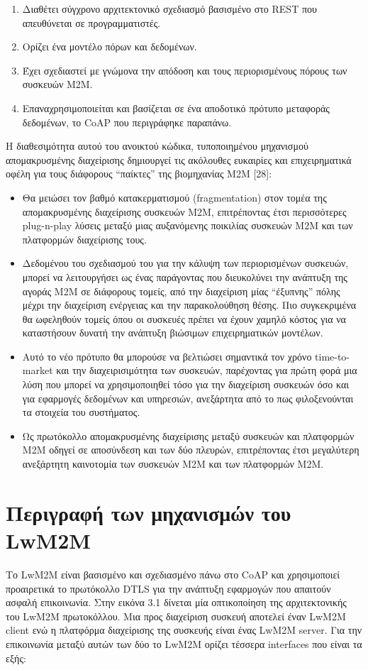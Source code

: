 \begin{enumerate}
	\item{Διαθέτει σύγχρονο αρχιτεκτονικό σχεδιασμό βασι­σμένο στο REST που απευθύνεται σε προγραμματιστές.}
	\item{Ορίζει ένα μοντέλο πόρων και δεδομένων.}
	\item{Έχει σχεδιαστεί με γνώμονα την απόδοση και τους περιορισμένους πόρους των συσκευών Μ2Μ.}
	\item{Επαναχρησιμοποιείται και βασίζεται σε ένα αποδοτικό πρότυπο μεταφοράς δεδομένων, το CoAP που περιγράφηκε παραπάνω.}
\end{enumerate}

Η διαθεσιμότητα αυτού του ανοικτού κώδικα, τυποποιη­μένου μηχανισμού απομακρυσμένης διαχείρισης δημιουργεί τις ακόλουθες ευκαιρίες και επιχειρηματικά οφέλη για τους διάφο­ρους “παίκτες” της βιομηχανίας Μ2Μ [28]:

\begin{itemize}
	\item{Θα μειώσει τον βαθμό κατακερματισμού (fragmentation) στον τομέα της απομακρυσμένης διαχείρισης συσκευών M2Μ, επιτρέποντας έτσι περισσότερες plug-n-play λύσεις μεταξύ μιας αυξανόμενης ποικιλίας συσκευών Μ2Μ και των πλατφορμών διαχείρισης τους.}
	\item{Δεδομένου του σχεδιασμού του για την κάλυψη των περιορισμένων συσκευών, μπορεί να λειτουργήσει ως ένας παράγοντας που διευκολύνει την ανάπτυξη της αγοράς Μ2Μ σε διάφορους τομείς, από την διαχείριση μίας “έξυπνης” πόλης μέχρι την διαχείριση ενέργειας και την παρακολούθηση θέσης. Πιο συγκεκριμένα θα ωφεληθούν τομείς όπου οι συσκευές πρέπει να έχουν χαμηλό κόστος για να καταστήσουν δυνατή την ανάπτυξη βιώσιμων επιχειρηματικών μοντέλων.}
	\item{Αυτό το νέο πρότυπο θα μπορούσε να βελτιώσει σημαντικά τον χρόνο time-to-market και την διαχειρισιμότητα των συσκευών, παρέχοντας για  πρώτη φορά μια λύση που μπορεί να χρησιμοποιηθεί τόσο για την διαχείριση συσκευών όσο και για εφαρμογές δεδομένων και υπηρεσιών, ανεξάρτητα από το πως φιλοξενούνται τα στοιχεία του συστήματος.}
	\item{Ως πρωτόκολλο απομακρυσμένης διαχείρισης μεταξύ συσκευών και πλατφορμών Μ2Μ οδηγεί σε αποσύνδεση και των δύο πλευρών, επιτρέποντας έτσι μεγαλύτερη ανεξάρτητη καινοτομία των συσκευών Μ2Μ και των πλατφορμών Μ2Μ. }
\end{itemize}

\section{Περιγραφή των μηχανισμών του LwM2M}
Το LwM2M είναι βασισμένο και σχεδιασμένο πάνω στο CoAP και χρησιμοποιεί προαιρετικά το πρωτόκολλο DTLS για την ανάπτυξη εφαρμογών που απαιτούν ασφαλή επικοινωνία. Στην ει­κόνα 3.1 δίνεται μία οπτικοποίηση της αρχιτεκτονικής του LwM2M πρωτοκόλλου. Μια προς διαχείριση συσκευή αποτελεί έναν LwM2M client ενώ η πλατφόρμα διαχείρισης της συσκευής είναι ένας LwM2M server. Για την επικοινωνία μεταξύ αυτών των δύο το LwM2M ορίζει τέσσερα interfaces που είναι τα εξής:


